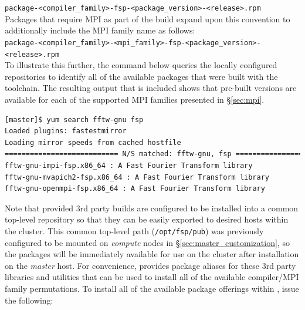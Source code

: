 \documentclass[letterpaper]{article}
\begin{document}
\noindent
\texttt{package-<compiler\_family>-fsp-<package\_version>-<release>.rpm} \\

\noindent Packages that require MPI as part of the build expand upon this convention to
additionally include the MPI family name as follows: \\

\noindent
\texttt{package-<compiler\_family>-<mpi\_family>-fsp-<package\_version>-<release>.rpm} \\

To illustrate this further, the command below queries the locally configured
repositories to identify all of the available \FFTW{} packages that were built
with the \GNU{} toolchain. The resulting output that is included shows that
pre-built versions are available for each of the supported MPI families
presented in \S\ref{sec:mpi}.

\begin{lstlisting}[language=bash]
[master]$ yum search fftw-gnu fsp
Loaded plugins: fastestmirror
Loading mirror speeds from cached hostfile
=========================== N/S matched: fftw-gnu, fsp ===========================
fftw-gnu-impi-fsp.x86_64 : A Fast Fourier Transform library
fftw-gnu-mvapich2-fsp.x86_64 : A Fast Fourier Transform library
fftw-gnu-openmpi-fsp.x86_64 : A Fast Fourier Transform library
\end{lstlisting}

Note that \FSP{} provided 3rd party builds are configured to be installed
into a common top-level repository so that they can be easily exported to
desired hosts within the cluster. This common top-level path
(\texttt{/opt/fsp/pub}) was previously configured to be mounted on {\em
  compute} nodes in \S\ref{sec:master_customization}, so the packages will be
immediately available for use on the cluster after installation on the {\em
  master} host.  For convenience, \FSP{} provides package aliases for these 3rd
party libraries and utilities that can be used to install all of the available
compiler/MPI family permutations. To install all of the available package
offerings within \FSP{}, issue the following:





\vspace*{0.2cm}
\end{document}
